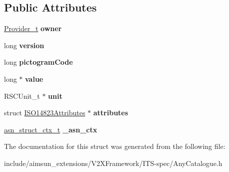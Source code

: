 \subsection*{Public Attributes}
\begin{DoxyCompactItemize}
\item 
\hyperlink{structProvider}{Provider\+\_\+t} {\bfseries owner}\hypertarget{structAnyCatalogue_a36c2ae36127ce5857487f791a33f3af8}{}\label{structAnyCatalogue_a36c2ae36127ce5857487f791a33f3af8}

\item 
long {\bfseries version}\hypertarget{structAnyCatalogue_a2866ce802a7c4b128546f0e9c1ac910e}{}\label{structAnyCatalogue_a2866ce802a7c4b128546f0e9c1ac910e}

\item 
long {\bfseries pictogram\+Code}\hypertarget{structAnyCatalogue_afef8966d366612643de57aefcb0f1ae7}{}\label{structAnyCatalogue_afef8966d366612643de57aefcb0f1ae7}

\item 
long $\ast$ {\bfseries value}\hypertarget{structAnyCatalogue_a99e6fe7ad648a08204f2eb50ed4c827e}{}\label{structAnyCatalogue_a99e6fe7ad648a08204f2eb50ed4c827e}

\item 
R\+S\+C\+Unit\+\_\+t $\ast$ {\bfseries unit}\hypertarget{structAnyCatalogue_a31d2b8e236224d5c3da7c0acaede53a5}{}\label{structAnyCatalogue_a31d2b8e236224d5c3da7c0acaede53a5}

\item 
struct \hyperlink{structISO14823Attributes}{I\+S\+O14823\+Attributes} $\ast$ {\bfseries attributes}\hypertarget{structAnyCatalogue_aa95f29c9c142d3497c9122ebddf6bc3b}{}\label{structAnyCatalogue_aa95f29c9c142d3497c9122ebddf6bc3b}

\item 
\hyperlink{structasn__struct__ctx__s}{asn\+\_\+struct\+\_\+ctx\+\_\+t} {\bfseries \+\_\+asn\+\_\+ctx}\hypertarget{structAnyCatalogue_aa4be7c1871ae0e8abc516e1e762b8031}{}\label{structAnyCatalogue_aa4be7c1871ae0e8abc516e1e762b8031}

\end{DoxyCompactItemize}


The documentation for this struct was generated from the following file\+:\begin{DoxyCompactItemize}
\item 
include/aimsun\+\_\+extensions/\+V2\+X\+Framework/\+I\+T\+S-\/spec/Any\+Catalogue.\+h\end{DoxyCompactItemize}
